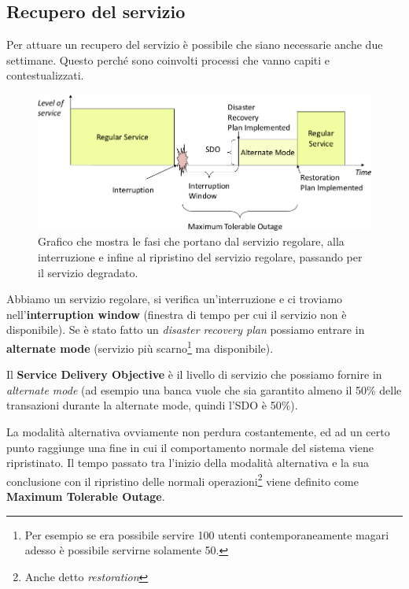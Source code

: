 \subsection{Recupero del servizio}

Per attuare un recupero del servizio è possibile che siano necessarie anche due
settimane.
Questo perché sono coinvolti processi che vanno capiti e contestualizzati.

\begin{figure}[h!]
        \begin{center}
                \includegraphics[scale=0.65]{res/img/recovery-times.png}
        \end{center}
        \caption{Grafico che mostra le fasi che portano dal servizio
        regolare, alla interruzione e infine al ripristino del servizio
        regolare, passando per il servizio degradato.}
\end{figure}

Abbiamo un servizio regolare, si verifica un'interruzione e ci troviamo
nell'\textbf{in\-ter\-rup\-tion win\-dow} (finestra di tempo per cui il servizio non è
disponibile). Se è stato fatto un \textit{disaster recovery plan}
possiamo entrare in \textbf{alternate mode} (servizio più scarno\footnote{Per
esempio se era possibile servire 100 utenti contemporaneamente magari adesso
\`e possibile servirne solamente 50.} ma disponibile).

Il \textbf{Service Delivery Objective} è il livello di servizio che possiamo
fornire in \textit{alternate mode} (ad esempio una banca vuole che sia
garantito almeno il 50\% delle transazioni durante la alternate mode, quindi
l'SDO è 50\%).

La modalità alternativa ovviamente non perdura costantemente, ed ad un certo
punto raggiunge una fine in cui il comportamento normale del sistema viene
ripristinato. Il tempo passato tra l'inizio della modalità alternativa e la
sua conclusione con il ripristino delle normali operazioni\footnote{Anche
detto \textit{restoration}} viene definito come \textbf{Maximum Tolerable
Outage}.

